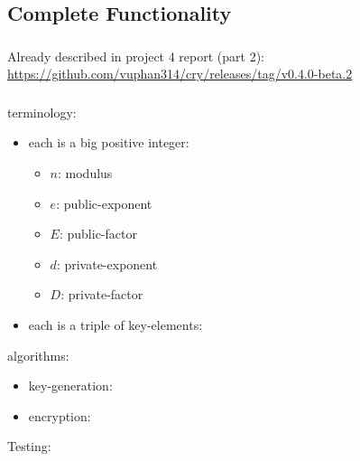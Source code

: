 \subsection{Complete Functionality}


\subsubsection{\rsa{} \cs}

Already described in project 4 report (part 2):
\url{https://github.com/vuphan314/cry/releases/tag/v0.4.0-beta.2}

\subsubsection{\dummy{} \cs}

terminology:
\begin{itemize}
\item each  is a big positive integer:
  \begin{itemize}
  \item $n$: modulus
  \item $e$: public-exponent
  \item $E$: public-factor
  \item $d$: private-exponent
  \item $D$: private-factor
  \end{itemize}
\item each  is a triple of key-elements:
\end{itemize}

algorithms:
\begin{itemize}
\item key-generation:
\item encryption:
\end{itemize}

Testing:
\codes{}

\subsubsection{\cry{} \cf}

\codes{}
